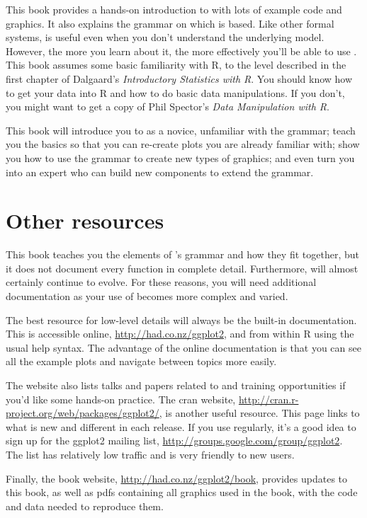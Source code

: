This book provides a hands-on introduction to \ggplot with lots of example code and graphics. It also explains the grammar on which \ggplot is based. Like other formal systems, \ggplot is useful even when you don't understand the underlying model. However, the more you learn about it, the more effectively you'll be able to use \ggplot.  This book assumes some basic familiarity with R, to the level described in the first chapter of Dalgaard’s \emph{Introductory Statistics with R}. You should know how to get your data into R and how to do basic data manipulations.  If you don't, you might want to get a copy of Phil Spector's \emph{Data Manipulation with R}.  

This book will introduce you to \ggplot as a novice, unfamiliar with the grammar; teach you the basics so that you can re-create plots you are already familiar with; show you how to use the grammar to create new types of graphics; and even turn you into an expert who can build new components to extend the grammar.

\section{Other resources}
\label{sec:other_resources}

This book teaches you the elements of \ggplot's grammar and how they fit together, but it does not document every function in complete detail.  Furthermore, \ggplot will almost certainly continue to evolve.  For these reasons, you will need additional documentation as your use of \ggplot becomes more complex and varied.

The best resource for low-level details will always be the built-in documentation. This is accessible online, \url{http://had.co.nz/ggplot2}, and from within R using the usual help syntax. The advantage of the online documentation is that you can see all the example plots and navigate between topics more easily. 

The website also lists talks and papers related to \ggplot and training opportunities if you'd like some hands-on practice. The {\sc cran} website, \url{http://cran.r-project.org/web/packages/ggplot2/}, is another useful resource. This page links to what is new and different in each release.  If you use \ggplot regularly, it's a good idea to sign up for the ggplot2 mailing list, \url{http://groups.google.com/group/ggplot2}.  The list has relatively low traffic and is very friendly to new users.

Finally, the book website, \url{http://had.co.nz/ggplot2/book}, provides updates to this book, as well as pdfs containing all graphics used in the book, with the code and data needed to reproduce them.  

